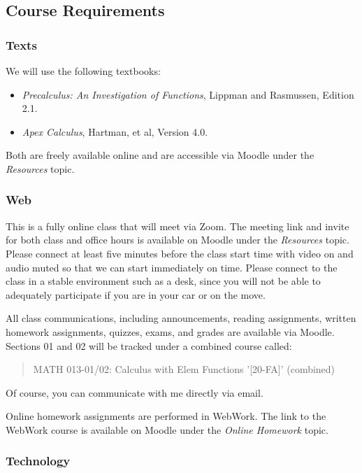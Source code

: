 \documentclass[letterpaper,12pt,fleqn]{article}
\begin{document}
\subsection*{Course Requirements}

\subsubsection*{Texts}

We will use the following textbooks:

\begin{itemize}
\item \emph{Precalculus: An Investigation of Functions}, Lippman and Rasmussen, Edition 2.1.
\item \emph{Apex Calculus}, Hartman, et al, Version 4.0.
\end{itemize}

Both are freely available online and are accessible via Moodle under the \emph{Resources} topic.

\subsubsection*{Web}

This is a fully online class that will meet via Zoom.  The meeting link and invite for both class and office hours
is available on Moodle under the \emph{Resources} topic.  Please connect at least five minutes before the class
start time with video on and audio muted so that we can start immediately on time.  Please connect to the class in
a stable environment such as a desk, since you will not be able to adequately participate if you are in your car or
on the move.

All class communications, including announcements, reading assignments, written homework assignments, quizzes,
exams, and grades are available via Moodle.  Sections 01 and 02 will be tracked under a combined course called:

\begin{quote}
  MATH 013-01/02: Calculus with Elem Functions '[20-FA]' (combined)
\end{quote}

Of course, you can communicate with me directly via email.

Online homework assignments are performed in WebWork.  The link to the WebWork course is available on Moodle
under the \emph{Online Homework} topic.

\subsubsection*{Technology}
\end{document}
